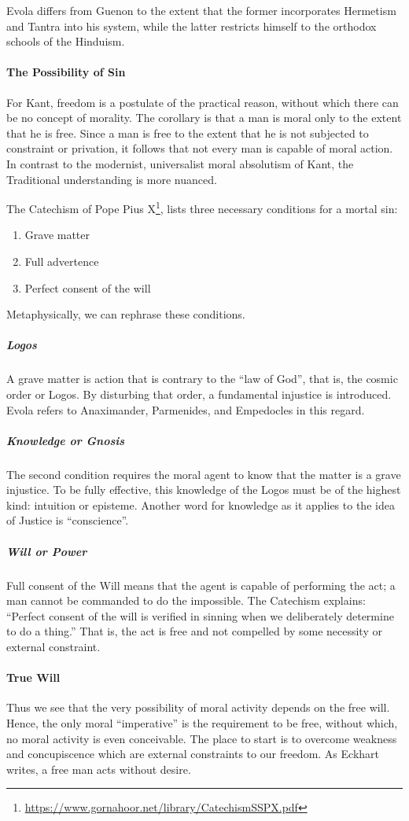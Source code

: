 Evola differs from Guenon to the extent that the former incorporates Hermetism and Tantra into his system, while the latter restricts himself to the orthodox schools of the Hinduism.

\paragraph{The Possibility of Sin}
For Kant, freedom is a postulate of the practical reason, without which there can be no concept of morality. The corollary is that a man is moral only to the extent that he is free. Since a man is free to the extent that he is not subjected to constraint or privation, it follows that not every man is capable of moral action. In contrast to the modernist, universalist moral absolutism of Kant, the Traditional understanding is more nuanced.

The Catechism of Pope Pius X\footnote{\url{https://www.gornahoor.net/library/CatechismSSPX.pdf}}, lists three necessary conditions for a mortal sin:

\begin{enumerate}
\item Grave matter 
\item Full advertence 
\item Perfect consent of the will 
\end{enumerate}
Metaphysically, we can rephrase these conditions.

\subparagraph{Logos}
A grave matter is action that is contrary to the “law of God”, that is, the cosmic order or Logos. By disturbing that order, a fundamental injustice is introduced. Evola refers to Anaximander, Parmenides, and Empedocles in this regard.

\subparagraph{Knowledge or Gnosis}
The second condition requires the moral agent to know that the matter is a grave injustice. To be fully effective, this knowledge of the Logos must be of the highest kind: intuition or episteme. Another word for knowledge as it applies to the idea of Justice is “conscience”.

\subparagraph{Will or Power}
Full consent of the Will means that the agent is capable of performing the act; a man cannot be commanded to do the impossible. The Catechism explains: “Perfect consent of the will is verified in sinning when we deliberately determine to do a thing.” That is, the act is free and not compelled by some necessity or external constraint.

\paragraph{True Will}
Thus we see that the very possibility of moral activity depends on the free will. Hence, the only moral “imperative” is the requirement to be free, without which, no moral activity is even conceivable. The place to start is to overcome weakness and concupiscence which are external constraints to our freedom. As Eckhart writes, a free man acts without desire.

